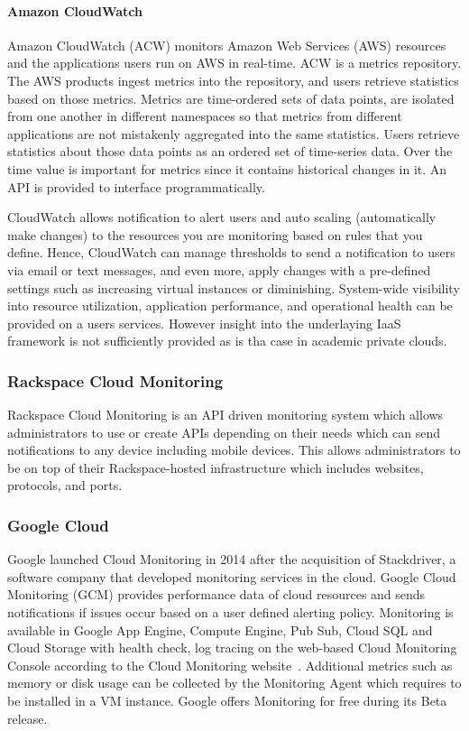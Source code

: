 \documentclass{sig-alternate-05-2015}
\begin{document}
\paragraph{Amazon CloudWatch}

Amazon CloudWatch (ACW) \cite{??} monitors Amazon Web Services (AWS)
resources and the applications users run on AWS in real-time. ACW is a
metrics repository. The AWS products ingest metrics into the
repository, and users retrieve statistics based on those metrics. 
Metrics are
time-ordered sets of data points, are isolated from one another in
different namespaces so that metrics from different applications are
not mistakenly aggregated into the same statistics. Users retrieve
statistics about those data points as an ordered set of time-series
data. Over the time value is important for metrics since it contains
historical changes in it. An API is provided to interface programmatically.

CloudWatch allows notification to alert users and auto scaling
(automatically make changes) to the resources you are monitoring based
on rules that you define. Hence, CloudWatch can manage thresholds
to send a notification to users via email or text messages, and even
more, apply changes with a pre-defined settings such as increasing
virtual instances or diminishing. System-wide visibility into
resource utilization, application performance, and operational health
can be provided on a users services. However insight into the
underlaying IaaS framework is not sufficiently provided as is tha case
in academic private clouds.

\subsubsection{Rackspace Cloud Monitoring}

Rackspace Cloud Monitoring is an API driven monitoring system which
allows administrators to use or create APIs depending on their needs
which can send notifications to any device including mobile
devices. This allows administrators to be on top of their
Rackspace-hosted infrastructure which includes websites, protocols,
and ports.

\subsubsection{Google Cloud}
Google launched Cloud Monitoring in 2014 after the acquisition of Stackdriver,
a software company that developed monitoring services in the cloud. Google
Cloud Monitoring (GCM) provides performance data of cloud resources and sends
notifications if issues occur based on a user defined alerting policy.
Monitoring is available in Google App Engine, Compute Engine, Pub Sub, Cloud
SQL and Cloud Storage with health check, log tracing on the web-based Cloud
Monitoring Console according to the Cloud Monitoring website~\cite{GCM}.
Additional metrics such as memory or disk usage can be collected by the
Monitoring Agent which requires to be installed in a VM instance. Google offers
Monitoring for free during its Beta release.
\end{document}
